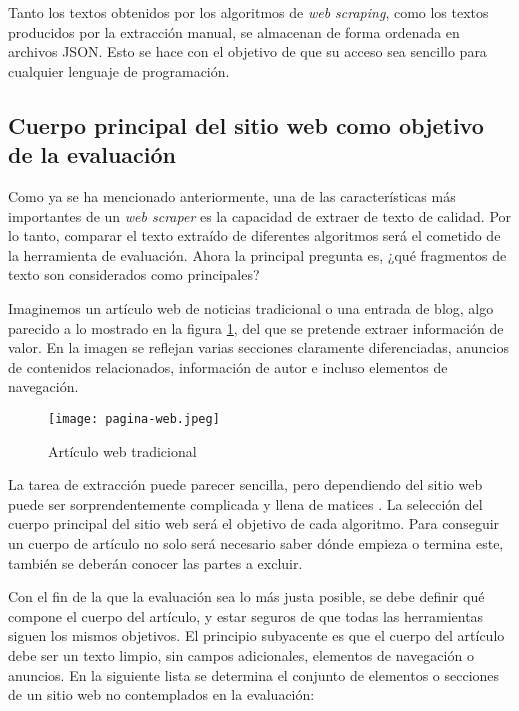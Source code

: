 Tanto los textos obtenidos por los algoritmos de \emph{web scraping}, como los textos producidos por la 
extracción manual, se almacenan de forma ordenada en archivos JSON. Esto se hace con el objetivo de que su 
acceso sea sencillo para cualquier lenguaje de programación.

\subsection{Cuerpo principal del sitio web como objetivo de la evaluación}
\label{subsec:cuerpo principal del sitio web como objetivo de la evaluacion}

Como ya se ha mencionado anteriormente, una de las características más importantes de un \emph{web scraper}
es la capacidad de extraer de texto de calidad. Por lo tanto, comparar el texto extraído de diferentes
algoritmos será el cometido de la herramienta de evaluación. Ahora la principal pregunta es, ¿qué fragmentos
de texto son considerados como principales?

Imaginemos un artículo web de noticias tradicional o una entrada de blog, algo parecido a lo mostrado en
la figura \ref{img:articulo web tradicional}, del que se pretende extraer
información de valor. En la imagen se reflejan varias secciones claramente diferenciadas, anuncios de
contenidos relacionados, información de autor e incluso elementos de navegación.

\begin{figure}[tphb]
  \centering
  \texttt{[image: pagina-web.jpeg]}
  \caption{Artículo web tradicional}
  \label{img:articulo web tradicional}
\end{figure}

La tarea de extracción puede parecer sencilla, pero dependiendo del sitio web puede ser sorprendentemente
complicada y llena de matices \cite{boilerplate-removal}. La selección del cuerpo principal del sitio web 
será el objetivo de cada algoritmo. Para conseguir un cuerpo de artículo no solo será necesario saber dónde 
empieza o termina este, también se deberán conocer las partes a excluir. 

Con el fin de la que la evaluación sea lo más justa posible, se debe definir qué compone el cuerpo del
artículo, y estar seguros de que todas las herramientas siguen los mismos objetivos. El principio subyacente 
es que el cuerpo del artículo debe ser un texto limpio, sin campos adicionales, elementos de navegación o 
anuncios. En la siguiente lista se determina el conjunto de elementos o secciones de un sitio web no 
contemplados en la evaluación:


